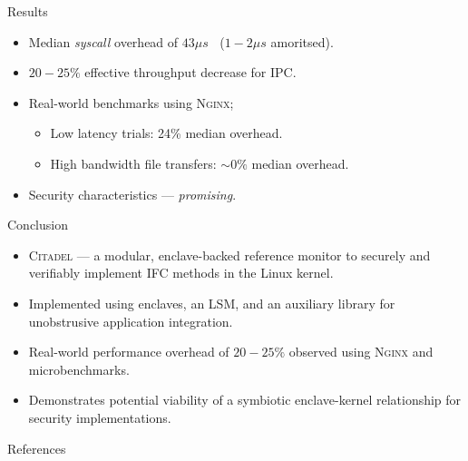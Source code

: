 \documentclass[xcolor=dvipsnames]{beamer}
\begin{document}
\begin{frame}{Results}
    \begin{itemize}
        \item Median \textit{syscall} overhead of $43\mu s\;\;$ ($1-2 \mu s$ amoritsed). \\ 
        \vspace{5mm}
        \item $20-25\%$ effective throughput decrease for IPC. \\ 
        \vspace{5mm}
        \item Real-world benchmarks using \textsc{Nginx};
        \begin{itemize}
            \item Low latency trials: 24\% median overhead.
            \item High bandwidth file transfers: $\sim 0\%$ median overhead.
        \end{itemize}

        
        \vspace{5mm}
        \item Security characteristics --- \textit{promising}.
    \end{itemize}
\end{frame}

\begin{frame}{Conclusion}
    \begin{itemize}
        \item \textsc{Citadel} ---  a modular, enclave-backed reference monitor to securely and verifiably implement IFC methods in the Linux kernel.
        \item Implemented using enclaves, an LSM, and an auxiliary library for unobstrusive application integration.
        \item Real-world performance overhead of $20-25\%$ observed using \textsc{Nginx} and microbenchmarks.
        \item Demonstrates potential viability of a symbiotic enclave-kernel relationship for security implementations.
    \end{itemize}
\end{frame}

\begin{frame}{References}
    
\end{frame}
\end{document}
